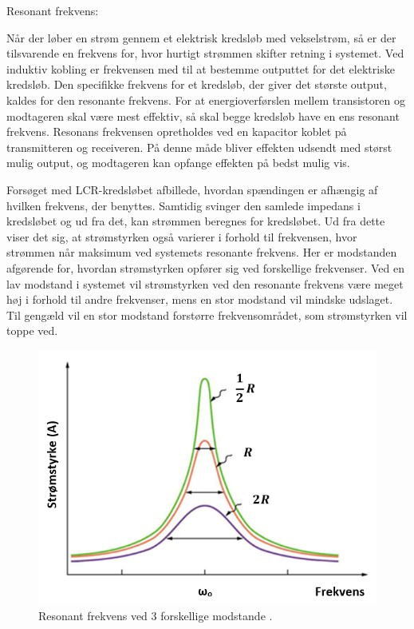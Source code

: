 Resonant frekvens:

Når der løber en strøm gennem et elektrisk kredsløb med vekselstrøm, så er der tilsvarende en frekvens for, hvor hurtigt strømmen skifter retning i systemet. Ved induktiv kobling er frekvensen med til at bestemme outputtet for det elektriske kredsløb. Den specifikke frekvens for et kredsløb, der giver det største output, kaldes for den resonante frekvens. For at energioverførslen mellem transistoren og modtageren skal være mest effektiv, så skal begge kredsløb have en ens resonant frekvens. Resonans frekvensen opretholdes ved en kapacitor koblet på transmitteren og receiveren. På denne måde bliver effekten udsendt med størst mulig output, og modtageren kan opfange effekten på bedst mulig vis.

Forsøget med LCR-kredsløbet afbillede, hvordan spændingen er afhængig af hvilken frekvens, der benyttes. Samtidig svinger den samlede impedans i kredsløbet og ud fra det, kan strømmen beregnes for kredsløbet. Ud fra dette viser det sig, at strømstyrken også varierer i forhold til frekvensen, hvor strømmen når maksimum ved systemets resonante frekvens. Her er modstanden afgørende for, hvordan strømstyrken opfører sig ved forskellige frekvenser. Ved en lav modstand i systemet vil strømstyrken ved den resonante frekvens være meget høj i forhold til andre frekvenser, mens en stor modstand vil mindske udslaget. Til gengæld vil en stor modstand forstørre frekvensområdet, som strømstyrken vil toppe ved. \cite{fysikbog}

\begin{figure}[H]
\centering
\includegraphics[scale=0.75]{Vildledning/Schematics/Resonanskurver}
\caption{Resonant frekvens ved 3 forskellige modstande \cite{Bresonant}.}
\label{figure:resonantfrekvens}
\end{figure}

